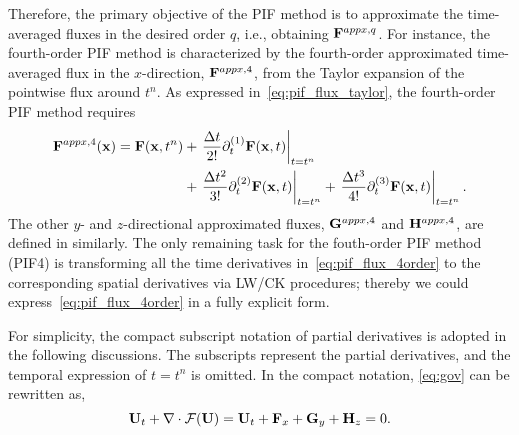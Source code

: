Therefore, the primary objective of the PIF method is to approximate the time-averaged fluxes
in the desired order \( q \), i.e., obtaining \( \mathbf{F}^{appx, q} \).
For instance, the fourth-order PIF method is characterized by
the fourth-order approximated time-averaged flux in the \( x \)-direction, \( \mathbf{F}^{appx,4} \),
from the Taylor expansion of the pointwise flux around \( t^{n} \).
As expressed in~\cref{eq:pif_flux_taylor}, the fourth-order PIF method requires
\begin{equation}\label{eq:pif_flux_4order}
    \begin{split}
        \mathbf{F}^{appx, 4} (\mathbf{x}) = \mathbf{F} (\mathbf{x}, t^{n})
            &+ \left. \frac{\Delta t}{2!} \partial_{t}^{(1)} \mathbf{F} (\mathbf{x}, t) \right|_{t = t^{n}} \\
            &+ \left. \frac{\Delta t^{2}}{3!} \partial_{t}^{(2)} \mathbf{F} (\mathbf{x}, t) \right|_{t = t^{n}}
            + \left. \frac{\Delta t^{3}}{4!} \partial_{t}^{(3)} \mathbf{F} (\mathbf{x}, t) \right|_{t = t^{n}}.
    \end{split}
\end{equation}
The other \( y \)- and \( z \)-directional approximated fluxes,
\( \mathbf{G}^{appx, 4} \) and \( \mathbf{H}^{appx, 4} \),
are defined in similarly.
The only remaining task for the fouth-order PIF method (PIF4) is transforming all the
time derivatives in~\cref{eq:pif_flux_4order} to the corresponding spatial derivatives
via LW/CK procedures;
thereby we could express~\cref{eq:pif_flux_4order} in a fully explicit form.

For simplicity, the compact subscript notation of partial derivatives is adopted
in the following discussions.
The subscripts represent the partial derivatives,
and the temporal expression of \( t = t^{n} \) is omitted.
In the compact notation, \cref{eq:gov} can be rewritten as,
\begin{equation}\label{eq:pif_gov_compact_notation}
    \mathbf{U}_{t} + \nabla \cdot \mathcal{F}(\mathbf{U}) = \mathbf{U}_{t} + \mathbf{F}_{x} + \mathbf{G}_{y} + \mathbf{H}_{z} = 0.
\end{equation}

